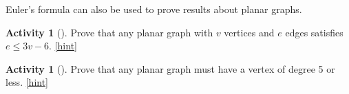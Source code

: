 \documentclass[10pt,]{book}
\theoremstyle{plain}
\theoremstyle{definition}
\theoremstyle{definition}
\theoremstyle{definition}
\newtheorem{activity}[project]{Activity}
\numberwithin{equation}{chapter}
\begin{document}
\par
\hypertarget{p-290}{}%
Euler's formula can also be used to prove results about planar graphs.%
\begin{activity}[]\label{activity-25}
\hypertarget{p-291}{}%
Prove that any planar graph with \(v\) vertices and \(e\) edges satisfies \(e \le 3v - 6\).%
\hfill{\tiny\hyperlink{a-30}{[hint]}\hypertarget{q-30}{}}\end{activity}
\begin{activity}[]\label{act-planardeg5}
\hypertarget{p-294}{}%
Prove that any planar graph must have a vertex of degree 5 or less.%
\hfill{\tiny\hyperlink{a-31}{[hint]}\hypertarget{q-31}{}}\end{activity}
\typeout{************************************************}
\typeout{************************************************}
\end{document}
